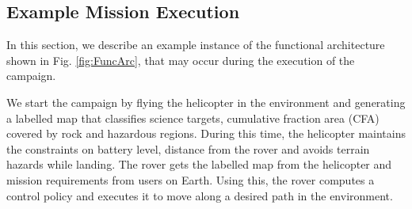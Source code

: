 \documentclass[conference]{IEEEtran}
\begin{document}
	\subsection{Example Mission Execution}
	In this section, we describe an example instance of the functional architecture shown in Fig. \ref{fig:FuncArc}, that may occur during the execution of the campaign. 
	
	We start the campaign by flying the helicopter in the environment and generating a labelled map that classifies science targets, cumulative fraction area (CFA) covered by rock and hazardous regions. During this time, the helicopter maintains the constraints on battery level, distance from the rover and avoids terrain hazards while landing. The rover gets the labelled map from the helicopter and mission requirements from users on Earth. Using this, the rover computes a control policy and executes it to move along a desired path in the environment.
	
\end{document}
